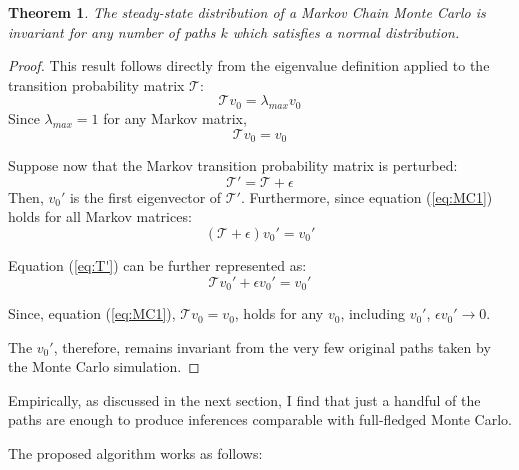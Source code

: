 \documentclass{wscpaperproc}
\theoremstyle{wsc}
\newtheorem{theorem}{Theorem}
\begin{document}
\begin{theorem}
    The steady-state distribution of a Markov Chain Monte Carlo is invariant for any number of paths $k$ which satisfies a normal distribution.  
\end{theorem}
\begin{proof}
This result follows directly from the eigenvalue definition applied to the transition probability matrix $\mathcal{T}$:
\begin{equation}
    \mathcal{T}v_0 = \lambda_{max} v_0
\end{equation}
Since $\lambda_{max} = 1$ for any Markov matrix, 
\begin{equation}\label{eq:MC1}
    \mathcal{T}v_0 = v_0
\end{equation}

Suppose now that the Markov transition probability matrix is perturbed:
\begin{equation}
    \mathcal{T'} = \mathcal{T} + \epsilon
\end{equation}
Then, $v_0'$ is the first eigenvector of $\mathcal{T'}$. Furthermore, since equation (\ref{eq:MC1}) holds for all Markov matrices:
\begin{equation}\label{eq:T'}
    (\mathcal{T}+\epsilon)v_0' = v_0'
\end{equation}

Equation (\ref{eq:T'}) can be further represented as:
\begin{equation}
    \mathcal{T}v_0'+\epsilon v_0' = v_0'
\end{equation}

Since, equation (\ref{eq:MC1}),  $\mathcal{T}v_0=v_0$, holds for any $v_0$, including $v_0'$, $\epsilon v_0'\to 0$.

The $v_0'$, therefore, remains invariant from the very few original paths taken by the Monte Carlo simulation.     
\end{proof}
    

Empirically, as discussed in the next section, I find that just a handful of the paths are enough to produce inferences comparable with full-fledged Monte Carlo. 


The proposed algorithm works as follows:
\begin{algorithm}
  \caption{Fast Monte Carlo} \label{alg:my-algorithm}

\end{algorithm}
\end{document}
